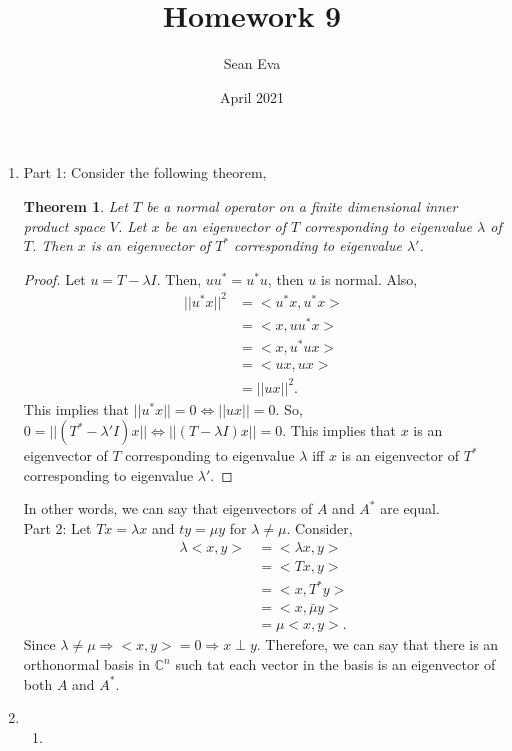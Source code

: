\documentclass{article}
\title{Homework 9}
\author{Sean Eva}
\date{April 2021}
\newtheorem{ishaan}{Theorem}[section]
\begin{document}
\maketitle

\begin{enumerate}
    \item 
    
    Part 1: Consider the following theorem,
    \begin{ishaan}
    Let $T$ be a normal operator on a finite dimensional inner product space $V$. Let $x$ be an eigenvector of $T$ corresponding to eigenvalue $\lambda$ of $T$. Then $x$ is an eigenvector of $T^*$ corresponding to eigenvalue $\lambda'$.
    \end{ishaan}
    \begin{proof}
    Let $u=T-\lambda I$. Then, $uu^*=u^*u$, then $u$ is normal. Also,
    \begin{align*}
        ||u^*x||^2&=<u^*x,u^*x>\\
        &=<x,uu^*x>\\
        &=<x,u^*ux>\\
        &=<ux,ux>\\
        &=||ux||^2.
    \end{align*} This implies that $||u^*x||=0 \iff ||ux||=0.$ So, $0=||(T^*-\lambda'I)x||\iff||(T-\lambda I)x||=0.$ This implies that $x$ is an eigenvector of $T$ corresponding to eigenvalue $\lambda$ iff $x$ is an eigenvector of $T^*$ corresponding to eigenvalue $\lambda'.$
    \end{proof}
    In other words, we can say that eigenvectors of $A$ and $A^*$ are equal.\\
    Part 2: Let $Tx=\lambda x$ and $ty=\mu y$ for $\lambda \neq \mu.$ Consider,
    \begin{align*}
        \lambda <x,y>&=<\lambda x,y>\\
        &=<Tx,y>\\
        &=<x,T^*y>\\
        &=<x,\bar{\mu}y>\\
        &=\mu<x,y>.
    \end{align*} Since $\lambda \neq \mu \Rightarrow <x,y>=0 \Rightarrow x\perp y.$ Therefore, we can say that there is an orthonormal basis in $\mathbb{C}^n$ such tat each vector in the basis is an eigenvector of both $A$ and $A^*.$
    
    \item
    
    \begin{enumerate}
        \item 
        

\end{enumerate}
\end{enumerate}
\end{document}

